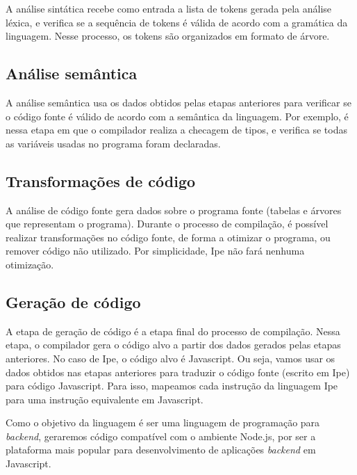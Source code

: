 A análise sintática recebe como entrada a lista de tokens gerada pela análise
léxica, e verifica se a sequência de tokens é válida de acordo com a gramática da
linguagem. Nesse processo, os tokens são organizados em formato de árvore.

\subsection{Análise semântica}

A análise semântica usa os dados obtidos pelas etapas anteriores para verificar se
o código fonte é válido de acordo com a semântica da linguagem. Por exemplo, é
nessa etapa em que o compilador realiza a checagem de tipos, e verifica se todas
as variáveis usadas no programa foram declaradas.


\subsection{Transformações de código}

A análise de código fonte gera dados sobre o programa fonte (tabelas e árvores que
representam o programa). Durante o processo de compilação, é possível realizar
transformações no código fonte, de forma a otimizar o programa, ou remover código
não utilizado. Por simplicidade, Ipe não fará nenhuma otimização.


\subsection{Geração de código}

A etapa de geração de código é a etapa final do processo de compilação. Nessa
etapa, o compilador gera o código alvo a partir dos dados gerados pelas etapas
anteriores. No caso de Ipe, o código alvo é Javascript. Ou seja, vamos usar os dados
obtidos nas etapas anteriores para traduzir o código fonte (escrito em Ipe) para
código Javascript. Para isso, mapeamos cada instrução da linguagem Ipe para uma
instrução equivalente em Javascript.

Como o objetivo da linguagem é ser uma linguagem de programação para \textit{backend},
geraremos código compatível com o ambiente Node.js, por ser a plataforma mais popular
para desenvolvimento de aplicações \textit{backend} em Javascript.
